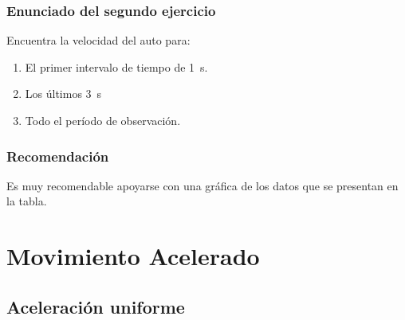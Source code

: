 \documentclass[14pt]{beamer}
\begin{document}
\begin{frame}
\frametitle{Enunciado del segundo ejercicio}
Encuentra la velocidad del auto para:
\begin{enumerate}[<+->]
\item El primer intervalo de tiempo de \SI{1}{\second}.
\item Los últimos \SI{3}{\second}
\item Todo el período de observación.
\end{enumerate}
\end{frame}
\begin{frame}
\frametitle{Recomendación}
Es muy recomendable apoyarse con una gráfica de los datos que se presentan en la tabla.
\end{frame}

\section{Movimiento Acelerado}
\subsection{Aceleración uniforme}
\end{document}
